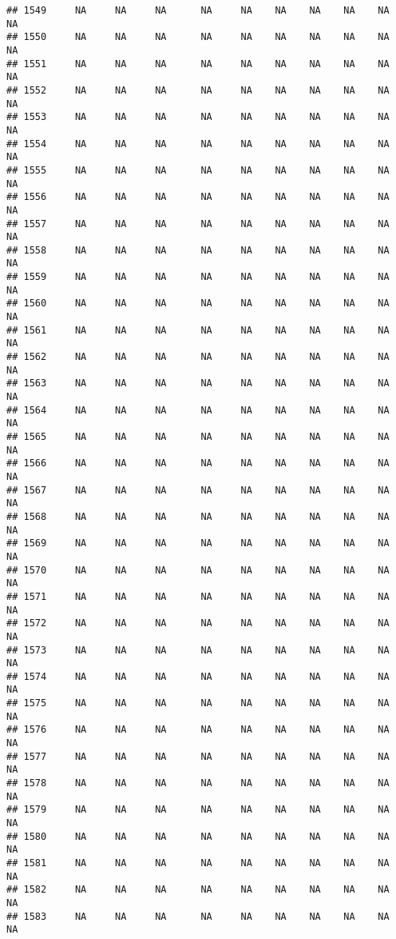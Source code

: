 \documentclass{article}\usepackage{graphicx, color}
\makeatletter
\newenvironment{kframe}{%
 \def\at@end@of@kframe{}%
 \ifinner\ifhmode%
  \def\at@end@of@kframe{\end{minipage}}%
  \begin{minipage}{\columnwidth}%
 \fi\fi%
 \def\FrameCommand##1{\hskip\@totalleftmargin \hskip-\fboxsep
 \colorbox{shadecolor}{##1}\hskip-\fboxsep
     \hskip-\linewidth \hskip-\@totalleftmargin \hskip\columnwidth}%
 \MakeFramed {\advance\hsize-\width
   \@totalleftmargin\z@ \linewidth\hsize
   \@setminipage}}%
 {\par\unskip\endMakeFramed%
 \at@end@of@kframe}
\newenvironment{knitrout}{}{} %
\makeatother
\begin{document}
\begin{knitrout}
\begin{kframe}
\begin{verbatim}
## 1549     NA     NA     NA      NA     NA    NA    NA    NA    NA     NA
## 1550     NA     NA     NA      NA     NA    NA    NA    NA    NA     NA
## 1551     NA     NA     NA      NA     NA    NA    NA    NA    NA     NA
## 1552     NA     NA     NA      NA     NA    NA    NA    NA    NA     NA
## 1553     NA     NA     NA      NA     NA    NA    NA    NA    NA     NA
## 1554     NA     NA     NA      NA     NA    NA    NA    NA    NA     NA
## 1555     NA     NA     NA      NA     NA    NA    NA    NA    NA     NA
## 1556     NA     NA     NA      NA     NA    NA    NA    NA    NA     NA
## 1557     NA     NA     NA      NA     NA    NA    NA    NA    NA     NA
## 1558     NA     NA     NA      NA     NA    NA    NA    NA    NA     NA
## 1559     NA     NA     NA      NA     NA    NA    NA    NA    NA     NA
## 1560     NA     NA     NA      NA     NA    NA    NA    NA    NA     NA
## 1561     NA     NA     NA      NA     NA    NA    NA    NA    NA     NA
## 1562     NA     NA     NA      NA     NA    NA    NA    NA    NA     NA
## 1563     NA     NA     NA      NA     NA    NA    NA    NA    NA     NA
## 1564     NA     NA     NA      NA     NA    NA    NA    NA    NA     NA
## 1565     NA     NA     NA      NA     NA    NA    NA    NA    NA     NA
## 1566     NA     NA     NA      NA     NA    NA    NA    NA    NA     NA
## 1567     NA     NA     NA      NA     NA    NA    NA    NA    NA     NA
## 1568     NA     NA     NA      NA     NA    NA    NA    NA    NA     NA
## 1569     NA     NA     NA      NA     NA    NA    NA    NA    NA     NA
## 1570     NA     NA     NA      NA     NA    NA    NA    NA    NA     NA
## 1571     NA     NA     NA      NA     NA    NA    NA    NA    NA     NA
## 1572     NA     NA     NA      NA     NA    NA    NA    NA    NA     NA
## 1573     NA     NA     NA      NA     NA    NA    NA    NA    NA     NA
## 1574     NA     NA     NA      NA     NA    NA    NA    NA    NA     NA
## 1575     NA     NA     NA      NA     NA    NA    NA    NA    NA     NA
## 1576     NA     NA     NA      NA     NA    NA    NA    NA    NA     NA
## 1577     NA     NA     NA      NA     NA    NA    NA    NA    NA     NA
## 1578     NA     NA     NA      NA     NA    NA    NA    NA    NA     NA
## 1579     NA     NA     NA      NA     NA    NA    NA    NA    NA     NA
## 1580     NA     NA     NA      NA     NA    NA    NA    NA    NA     NA
## 1581     NA     NA     NA      NA     NA    NA    NA    NA    NA     NA
## 1582     NA     NA     NA      NA     NA    NA    NA    NA    NA     NA
## 1583     NA     NA     NA      NA     NA    NA    NA    NA    NA     NA

\end{verbatim}
\end{kframe}
\end{knitrout}
\end{document}
